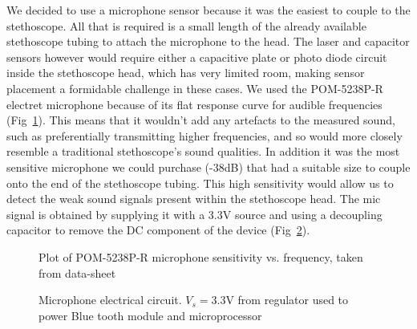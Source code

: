 We decided to use a microphone sensor because it was the easiest to couple to the stethoscope. All that is required is a small length of the already available stethoscope tubing to attach the microphone to the head. The laser and capacitor sensors however would require either a capacitive plate or photo diode circuit inside the stethoscope head, which has very limited room, making sensor placement a formidable challenge in these cases. We used the POM-5238P-R electret microphone because of its flat response curve for audible frequencies (Fig~\ref{fig:mic_sensitivity}). This means that it wouldn't add any artefacts to the measured sound, such as preferentially transmitting higher frequencies, and so would more closely resemble a traditional stethoscope's sound qualities. In addition it was the most sensitive microphone we could purchase (-38dB) that had a suitable size to couple onto the end of the stethoscope tubing. This high sensitivity would allow us to detect the weak sound signals present within the stethoscope head. The mic signal is obtained by supplying it with a 3.3V source and using a decoupling capacitor to remove the DC component of the device (Fig~\ref{fig:mic_circuit}).
\begin{figure}[!htb]
	\centering
	\caption{Plot of POM-5238P-R microphone sensitivity vs. frequency, taken from  data-sheet}
	\label{fig:mic_sensitivity}
\end{figure}
\begin{figure}[!htb]
	\centering
	\caption{Microphone electrical circuit. $V_s=3.3$V from regulator used to power Blue tooth module and microprocessor}
	\label{fig:mic_circuit}
\end{figure}

